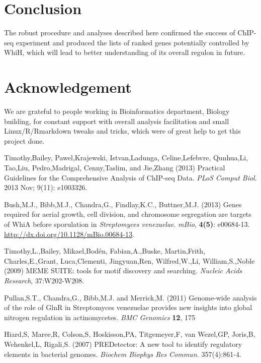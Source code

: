 \documentclass{bioinfo}
\begin{document}
\newpage

\section{Conclusion}
The robust procedure and analyses described here confirmed the success of ChIP-seq experiment and produced the lists of ranked genes potentially controlled by WhiH, which will lead to better understanding of its overall regulon in future.


\section*{Acknowledgement}
We are grateful to people working in Bioinformatics department, Biology building, for constant support with overall analysis facilitation and small Linux/R/Rmarkdown tweaks and tricks, which were of great help to get this project done.


\begin{thebibliography}{}
 Timothy,Bailey, Pawel,Krajewski, Istvan,Ladunga, Celine,Lefebvre, Qunhua,Li, Tao,Liu, Pedro,Madrigal, Cenny,Taslim, and Jie,Zhang (2013) Practical Guidelines for the Comprehensive Analysis of ChIP-seq Data. {\it PLoS Comput Biol}. 2013 Nov; 9(11): e1003326.

 Bush,M.J., Bibb,M.J., Chandra,G., Findlay,K.C., Buttner,M.J. (2013) Genes required for aerial growth, cell division, and chromosome segregation are
targets of WhiA before sporulation in {\it Streptomyces venezuelae}. {\it mBio}, {\bf 4(5)}: e00684-13. \href{http://dx.doi.org/10.1128/mBio.00684-13}{http://dx.doi.org/10.1128/mBio.00684-13}.

 Timothy,L.,Bailey, Mikael,Bod{\'e}n, Fabian,A.,Buske, Martin,Frith, Charles,E.,Grant, Luca,Clementi, Jingyuan,Ren, Wilfred,W.,Li, William,S.,Noble (2009) MEME SUITE: tools for motif discovery and searching. {\it Nucleic Acids Research}, 37:W202-W208.

 Pullan,S.T., Chandra,G., Bibb,M.J. and Merrick,M. (2011) Genome-wide analysis of the role of GlnR in Streptomyces venezuelae provides new insights into global nitrogen regulation in actinomycetes. {\it BMC Genomics} {\bf 12}, 175

 Hiard,S, Maree,R, Colson,S, Hoskisson,PA, Titgemeyer,F, van Wezel,GP, Joris,B, Wehenkel,L, Rigali,S. (2007) PREDetector: A new tool to identify regulatory elements in bacterial genomes. {\it Biochem Biophys Res Commun.} 357(4):861-4.


\end{thebibliography}
\end{document}

